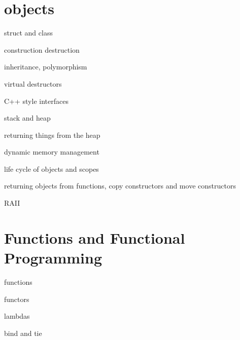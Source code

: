 \documentclass[aspectratio=169]{beamer}
\begin{document}
\section{objects}

\begin{frame}
  struct and class

  construction destruction
\end{frame}

\begin{frame}
  inheritance, polymorphism

  virtual destructors
\end{frame}

\begin{frame}
  C++ style interfaces

\end{frame}

\begin{frame}
  stack and heap
\end{frame}

\begin{frame}
  returning things from the heap

  dynamic memory management
\end{frame}

\begin{frame}
  life cycle of objects and scopes

  returning objects from functions, copy constructors and move constructors
\end{frame}

\begin{frame}
  RAII  
\end{frame}

\section{Functions and Functional Programming}

\begin{frame}
  functions
\end{frame}

\begin{frame}
  functors
\end{frame}

\begin{frame}
  lambdas
\end{frame}

\begin{frame}
  bind and tie
\end{frame}
\end{document}
